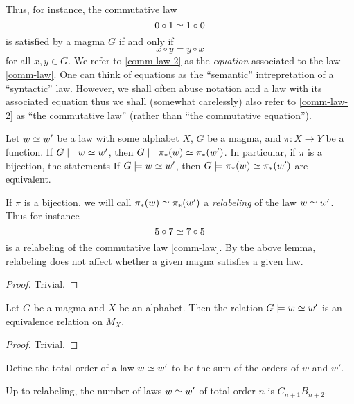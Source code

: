 Thus, for instance, the commutative law
\begin{equation}\label{comm-law}
  0 \circ 1 \simeq 1 \circ 0
\end{equation}
is satisfied by a magma $G$ if and only if
\begin{equation}\label{comm-law-2}
 x \circ y = y \circ x
\end{equation}
for all $x, y \in G$.  We refer to \eqref{comm-law-2} as the \emph{equation} associated to the law \eqref{comm-law}.  One can think of equations as the ``semantic'' intrepretation of a ``syntactic'' law.  However, we shall often abuse notation and a law with its associated equation thus we shall (somewhat carelessly) also refer to \eqref{comm-law-2} as ``the commutative law'' (rather than ``the commutative equation'').

\begin{lemma}[Pushforward]\label{push}  Let $w \simeq w'$ be a law with some alphabet $X$, $G$ be a magma, and $\pi: X \to Y$ be a function.  If $G \models w \simeq w'$, then $G \models \pi_*(w) \simeq \pi_*(w')$.  In particular, if $\pi$ is a bijection, the statements If $G \models w \simeq w'$, then $G \models \pi_*(w) \simeq \pi_*(w')$ are equivalent.
\end{lemma}

If $\pi$ is a bijection, we will call $\pi_*(w) \simeq \pi_*(w')$ a \emph{relabeling} of the law $w \simeq w'$.  Thus for instance
$$ 5 \circ 7 \simeq 7 \circ 5$$
is a relabeling of the commutative law \eqref{comm-law}.  By the above lemma, relabeling does not affect whether a given magna satisfies a given law.

\begin{proof}  Trivial.
\end{proof}

\begin{lemma}[Equivalence]\label{equiv}  Let $G$ be a magma and $X$ be an alphabet.  Then the relation $G \models w \simeq w'$ is an equivalence relation on $M_X$.
\end{lemma}

\begin{proof}  Trivial.
\end{proof}

Define the total order of a law $w \simeq w'$ to be the sum of the orders of $w$ and $w'$.

\begin{lemma}\label{law-count}  Up to relabeling, the number of laws $w \simeq w'$ of total order $n$ is $C_{n+1} B_{n+2}$.
\end{lemma}


